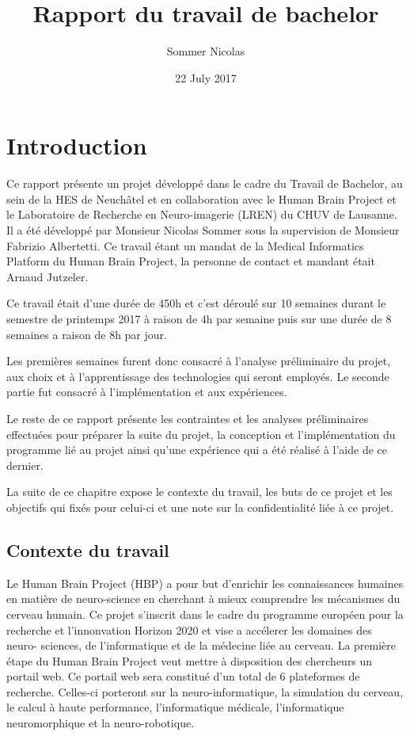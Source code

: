 \documentclass[a4paper,10pt,openany,oneside]{sphinxmanual}
\title{Rapport du travail de bachelor}
\date{22 July 2017}
\author{Sommer Nicolas}
\begin{document}
\maketitle
\tableofcontents
{}\label{index::doc}



\chapter{Introduction}
\label{index:introduction}\label{index:rapport-du-travail-de-bachelor}
Ce rapport présente un projet développé dans le cadre du Travail de Bachelor, au sein de la HES de Neuchâtel
et en collaboration avec le Human Brain Project et le Laboratoire de Recherche en Neuro-imagerie (LREN)
du CHUV de Lausanne. Il a été développé par Monsieur Nicolas Sommer sous la supervision de Monsieur
Fabrizio Albertetti. Ce travail étant un mandat de la Medical Informatics Platform du Human Brain Project,
la personne de contact et mandant était Arnaud Jutzeler.

Ce travail était d'une durée de 450h et c'est déroulé sur 10 semaines durant le semestre de
printemps 2017 à raison de 4h par semaine puis sur une durée de 8 semaines a raison de 8h par
jour.

Les premières semaines furent donc consacré à l'analyse préliminaire du projet, aux choix et à
l'apprentissage des technologies qui seront employés. Le seconde partie fut consacré à l'implémentation
et aux expériences.

Le reste de ce rapport présente les contraintes et les analyses préliminaires effectuées pour préparer
la suite du projet, la conception et l'implémentation du programme lié au projet ainsi qu'une expérience
qui a été réalisé à l'aide de ce dernier.

La suite de ce chapitre expose le contexte du travail, les buts de ce projet et les objectifs qui fixés pour
celui-ci et une note sur la confidentialité liée à ce projet.


\section{Contexte du travail}
\label{index:contexte-du-travail}
Le Human Brain Project (HBP) a pour but d'enrichir les connaissances humaines en matière de neuro-science
en cherchant à mieux comprendre les mécanismes du cerveau humain. Ce projet s'inscrit dans le cadre du
programme européen pour la recherche et l'innonvation Horizon 2020 et vise a accélerer les domaines des neuro-
sciences, de l'informatique et de la médecine liée au cerveau. La première étape du Human Brain Project veut
mettre à disposition des chercheurs un portail web. Ce portail web sera constitué d'un total de 6 plateformes
de recherche. Celles-ci porteront sur la neuro-informatique, la simulation du cerveau, le calcul à haute performance,
l'informatique médicale, l'informatique neuromorphique et la neuro-robotique.
\end{document}
